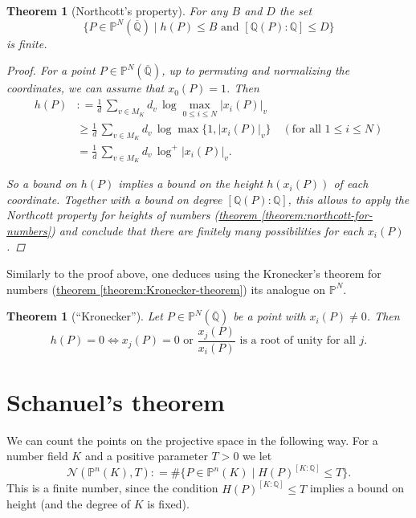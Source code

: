 \documentclass{article}
\newcommand{\refref}[2]{\hyperref[#2]{#1 \ref*{#2}}}
\newtheorem{theorem}[proposition]{Theorem}
\theoremstyle{definition}
\newcommand{\dfn}{\mathrel{\mathop:}=}
\newcommand{\QQ}{\mathbb{Q}}
\newcommand{\PP}{\mathbb{P}}
\begin{document}
\begin{theorem}[Northcott's property]
  \label{theorem:northcott-on-Pn}
  For any $B$ and $D$ the set
  $$\{P \in \PP^N (\overline{\QQ}) \mid h (P) \le B \text{ and } [\QQ (P) : \QQ] \le D \}$$
  is finite.

  \begin{proof}
    For a point $P \in \PP^N (\overline{\QQ})$, up to permuting and normalizing
    the coordinates, we can assume that $x_0 (P) = 1$. Then
    \begin{align*}
      h (P) & \dfn \frac{1}{d} \, \sum_{v\in M_K} d_v \, \log \max_{0\le i\le N} |x_i (P)|_v\\
            & \ge \frac{1}{d} \, \sum_{v\in M_K} d_v \, \log \max \{1, |x_i (P)|_v\} \quad (\text{for all }1 \le i \le N)\\
            & = \frac{1}{d} \, \sum_{v\in M_K} d_v \, \log^+ |x_i (P)|_v.
    \end{align*}

    So a bound on $h (P)$ implies a bound on the height $h (x_i (P))$ of each
    coordinate. Together with a bound on degree $[\QQ (P) : \QQ]$, this allows
    to apply the Northcott property for heights of numbers
    (\refref{theorem}{theorem:northcott-for-numbers}) and conclude that there
    are finitely many possibilities for each $x_i (P)$.
  \end{proof}
\end{theorem}

Similarly to the proof above, one deduces using the Kronecker's theorem for
numbers (\refref{theorem}{theorem:Kronecker-theorem}) its analogue on $\PP^N$.

\begin{theorem}[``Kronecker'']
  Let $P \in \PP^N (\overline{\QQ})$ be a point with $x_i (P) \ne 0$. Then
  $$h (P) = 0 \iff x_j (P) = 0 \text{ or }\frac{x_j (P)}{x_i (P)}\text{ is a root of unity for all }j.$$
\end{theorem}

\section{Schanuel's theorem}

We can count the points on the projective space in the following way. For a
number field $K$ and a positive parameter $T > 0$ we let
$$\mathcal{N} (\PP^n (K), T) \dfn \# \{ P \in \PP^n (K) \mid H (P)^{[K:\QQ]} \le T \}.$$
This is a finite number, since the condition $H (P)^{[K:\QQ]} \le T$ implies a
bound on height (and the degree of $K$ is fixed).
\end{document}
